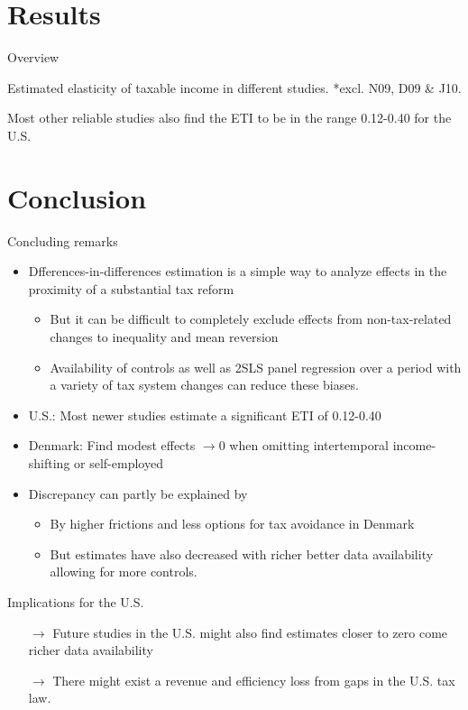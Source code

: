 \documentclass[8pt]{beamer}
\begin{document}
\section{Results}


\begin{frame}{Overview}
  \begin{table}
    \centering
    \footnotesize
    
    \caption{Estimated elasticity of taxable income in different studies. *excl. N09, D09 \& J10.}
    \label{tab:elasticities}
  \end{table}
  Most other reliable studies also find the ETI to be in the range 0.12-0.40 for the U.S. \citep{saez2012elasticity}
\end{frame}


\section{Conclusion}


\begin{frame}{Concluding remarks}
  \begin{itemize}
    \item Dfferences-in-differences estimation is a simple way to analyze effects in the proximity of a substantial tax reform
    \begin{itemize}
      \item But it can be difficult to completely exclude effects from non-tax-related changes to inequality and mean reversion
      \item Availability of controls as well as 2SLS panel regression over a period with a variety of tax system changes can reduce these biases.
    \end{itemize}
    \item U.S.: Most newer studies estimate a significant ETI of 0.12-0.40
    \item Denmark: Find modest effects $\rightarrow 0$ when omitting intertemporal income-shifting or self-employed
    \item Discrepancy can partly be explained by
    \begin{itemize}
      \item By higher frictions and less options for tax avoidance in Denmark
      \item But estimates have also decreased with richer better data availability allowing for more controls.
    \end{itemize}
  \end{itemize}
  Implications for the U.S.
  \begin{itemize}
    \item[$\rightarrow$] Future studies in the U.S. might also find estimates closer to zero come richer data availability
    \item[$\rightarrow$] There might exist a revenue and efficiency loss from gaps in the U.S. tax law.
  \end{itemize}



\end{frame}
\end{document}
